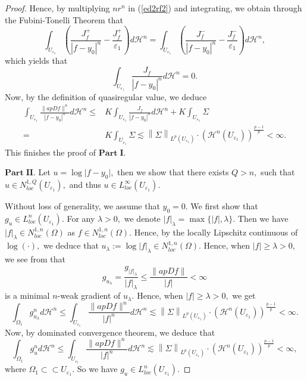 \documentclass[11pt,twoside]{article}
\theoremstyle{definition}
\theoremstyle{remark}
\newcommand{\abs}[1]{\left|#1\right|}
\newcommand{\aleq}{\lesssim}
\begin{document}
\begin{proof}
Hence, by multiplying $nr^{n}$ in (\ref{ed2rf2}) and integrating, we obtain through the Fubini-Tonelli Theorem that 
$$\int_{U_{\varepsilon_{1}}}\left(\frac{J_{f}^{+}}{\abs{f-y_{0}}^{n}}-\frac{J_{f}^{+}}{\varepsilon_{1}}\right)d\mathcal{H}^{n}=\int_{U_{\varepsilon_{1}}}\left(\frac{J_{f}^{-}}{\abs{f-y_{0}}^{n}}-
\frac{J_{f}^{-}}{\varepsilon_{1}}\right)d\mathcal{H}^{n},$$
which yields that  
$$\int_{U_{\varepsilon_{1}}}\frac{J_{f}}{\abs{f-y_{0}}^{n}}d\mathcal{H}^{n}=0.$$ 
Now, by the definition of quasiregular value, we deduce 
\begin{equation}
\begin{aligned}
\int_{U_{\varepsilon_{1}}}\frac{\|apDf\|^{n}}{\abs{f-y_{0}}^{n}}d\mathcal{H}^{n}\leq&K\int_{U_{\varepsilon_{1}}}\frac{J_{f}}{\abs{f-y_{0}}^{n}}d\mathcal{H}^{n}+
K\int_{U_{\varepsilon_{1}}}\Sigma\\
=&K\int_{U_{\varepsilon_{1}}}\Sigma\aleq\left\|\Sigma\right\|_{L^{p}(U_{\varepsilon_{1}})}\cdot (\mathcal{H}^{n}(U_{\varepsilon_{1}}))^{\frac{p-1}{p}}<\infty.
\end{aligned}
\end{equation}
This finishes the proof of $\mathbf{Part}\;\mathbf{I}.$

$\mathbf{Part}\;\mathbf{II}.$ Let $u=\log\vert f-y_{0}\vert,$ then we show that there exists $Q>n,$ such that $u\in N_{loc}^{1,Q}(U_{\varepsilon_{1}}),$ and thus  
 $u\in L_{loc}^{\infty}(U_{\varepsilon_{1}}).$

Without loss of generality, we assume that $y_{0}=0.$ We first show that  $g_{u}\in L_{loc}^{n}(U_{\varepsilon_{1}}).$  For any $\lambda>0,$ we denote $\vert f\vert_{\lambda}=\max\{\vert f\vert,\lambda\}.$ Then we have $\vert f\vert_{\lambda}\in N_{loc}^{1,n}(\Omega)$ as $f\in N_{loc}^{1,n}(\Omega).$
Hence, by the locally Lipschitz continuous of $\log(\cdot),$ we deduce that $u_{\lambda}:=\log\vert f\vert_{\lambda}\in N_{loc}^{1,n}(\Omega).$ 
Hence, when $\vert f\vert\geq\lambda>0,$ we see from \cite[Proposition 2.17]{BB11}  that
$$g_{u_{\lambda}}=\frac{g_{\vert f\vert_{\lambda}}}{\vert f\vert_{\lambda}}\leq\frac{\|apDf\|}{\vert f\vert}<\infty$$ is 
 a minimal $n$-weak gradient of $u_{\lambda}.$  Hence, when $\vert f\vert\geq\lambda>0,$ we get 
 $$\int_{\Omega_{1}}g_{u_{\lambda}}^{n}d\mathcal{H}^{n}\leq\int_{U_{\varepsilon_{1}}}\frac{\|apDf\|^{n}}{\abs{f}^{n}}d\mathcal{H}^{n}\aleq\left\|\Sigma\right\|_{L^{p}(U_{\varepsilon_{1}})}\cdot (\mathcal{H}^{n}(U_{\varepsilon_{1}}))^{\frac{p-1}{p}}<\infty.$$
Now, by dominated convergence theorem, we deduce that 
$$\int_{\Omega_{1}}g_{u}^{n}d\mathcal{H}^{n}\leq\int_{U_{\varepsilon_{1}}}\frac{\|apDf\|^{n}}{\abs{f}^{n}}d\mathcal{H}^{n}\aleq\left\|\Sigma\right\|_{L^{p}(U_{\varepsilon_{1}})}\cdot (\mathcal{H}^{n}(U_{\varepsilon_{1}}))^{\frac{p-1}{p}}<\infty,$$
where $\Omega_{1}\subset\subset U_{\varepsilon_{1}}.$ So we have $g_{u}\in L_{loc}^{n}(U_{\varepsilon_{1}}).$ 



\end{proof}
\end{document}
